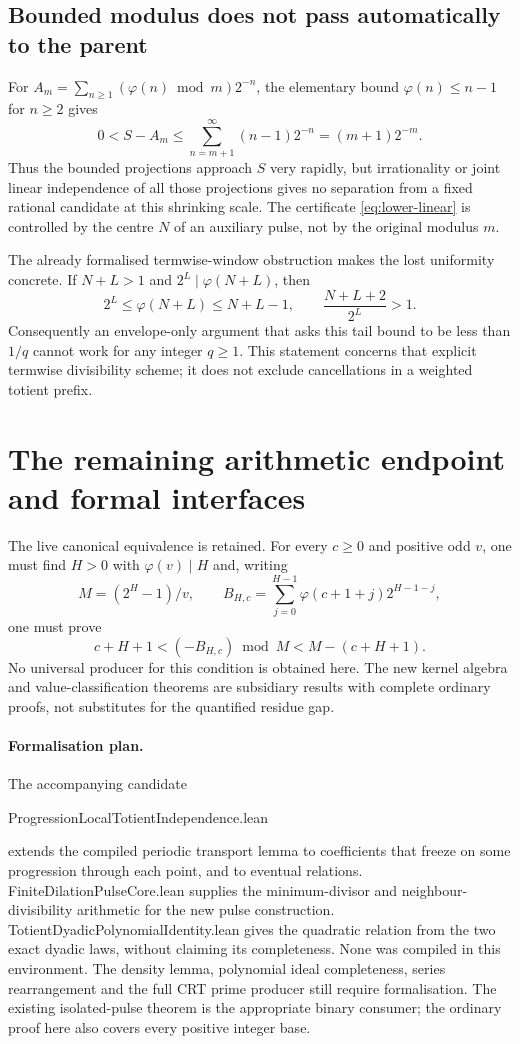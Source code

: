 \documentclass[11pt,a4paper]{article}
\theoremstyle{definition}\newtheorem{definition}[theorem]{Definition}
\theoremstyle{remark}\newtheorem{remark}[theorem]{Remark}
\newcommand{\ph}{\varphi}\newcommand{\rad}{\operatorname{rad}}
\begin{document}
\subsection{Bounded modulus does not pass automatically to the parent}
For $A_m=\sum_{n\ge1}(\ph(n)\bmod m)2^{-n}$, the elementary bound
$\ph(n)\le n-1$ for $n\ge2$ gives
\[
 0<S-A_m\le\sum_{n=m+1}^{\infty}(n-1)2^{-n}
 =(m+1)2^{-m}.
\]
Thus the bounded projections approach $S$ very rapidly, but irrationality or
joint linear independence of all those projections gives no separation from
a fixed rational candidate at this shrinking scale.
The certificate \eqref{eq:lower-linear} is controlled by the centre $N$ of
an auxiliary pulse, not by the original modulus $m$.

The already formalised termwise-window obstruction makes the lost uniformity
concrete. If $N+L>1$ and $2^L\mid\ph(N+L)$, then
\[
 2^L\le\ph(N+L)\le N+L-1,
 \qquad \frac{N+L+2}{2^L}>1.
\]
Consequently an envelope-only argument that asks this tail bound to be less
than $1/q$ cannot work for any integer $q\ge1$.
This statement concerns that explicit termwise divisibility scheme; it does
not exclude cancellations in a weighted totient prefix.

\section{The remaining arithmetic endpoint and formal interfaces}
The live canonical equivalence is retained. For every $c\ge0$ and positive odd
$v$, one must find $H>0$ with $\ph(v)\mid H$ and, writing
\[
 M=(2^H-1)/v,\qquad
 B_{H,c}=\sum_{j=0}^{H-1}\ph(c+1+j)2^{H-1-j},
\]
one must prove
\[
 c+H+1<(-B_{H,c})\bmod M<M-(c+H+1).
\]
No universal producer for this condition is obtained here. The new kernel
algebra and value-classification theorems are subsidiary results with complete
ordinary proofs, not substitutes for the quantified residue gap.

\paragraph{Formalisation plan.}
The accompanying candidate\par
{\small\ttfamily ProgressionLocalTotientIndependence.lean}\par
extends the compiled periodic transport lemma to coefficients that freeze on
some progression through each point, and to eventual relations.
{\small\ttfamily FiniteDilationPulseCore.lean} supplies the minimum-divisor and
neighbour-divisibility arithmetic for the new pulse construction.
{\small\ttfamily TotientDyadicPolynomialIdentity.lean} gives the quadratic relation from
the two exact dyadic laws, without claiming its completeness.
None was compiled in this environment. The density lemma, polynomial ideal
completeness, series rearrangement and the full CRT prime producer still require
formalisation. The existing isolated-pulse theorem is the appropriate binary
consumer; the ordinary proof here also covers every positive integer base.
\end{document}

